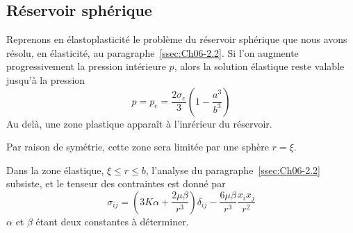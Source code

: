 \subsection{Réservoir sphérique} \label{ssec:Ch10-2.2}
Reprenons en élastoplasticité le problème du réservoir sphérique que nous avons résolu, en élasticité, au paragraphe~\ref{ssec:Ch06-2.2}.
Si l'on augmente progressivement la pression intérieure $p$, alors la solution élastique reste valable jusqu'à la pression 
\begin{equation}
    p = p_e = \frac{2\sigma_e}{3} \left( 1 - \frac{a^3}{b^3} \right)
    \label{eq:Ch10-032}
\end{equation}
Au delà, une zone plastique apparaît à l'inrérieur du réservoir. 
\begin{multicols}{2}
    \begin{center}
    \end{center}
    \columnbreak
    Par raison de symétrie, cette zone sera limitée par une sphère $r=\xi$.
\end{multicols}
Dans la zone élastique, $\xi \leq r \leq b$, l'analyse du paragraphe~\ref{ssec:Ch06-2.2} subsiste, et le tenseur des contraintes est donné par 
\begin{equation}
    \sigma_{ij} = \left( 3 K \alpha + \frac{2\mu \beta}{r^3} \right) \delta_{ij} - \frac{6\mu \beta}{r^3} \frac{x_ix_j}{r^2}
    \label{eq:Ch10-033}
\end{equation}
$\alpha$ et $\beta$ étant deux constantes à déterminer.

\endinput
Dans la zone plastique, a.~'!. <~ , d',,?rès la symétrie sphérique du problème, le tenseur des contraintes aura la forme suivante 

où TIC'!.) représente la partie sphérique du tenseur des contraintes, et 't:('t,) son déviateur. Ce tenseur est de révolution autour de la direction radiale, et les contraintes principales sont 

Les équations d'équilibre appliquées à \eqref{eq:Ch10-034} donnent 
\eqref{eq:Ch10-036} 	.2, "t;'C'I.) 1" G 1:('t,) _ ït'(IL) = 0 It. 
équation différentielle reliant les deux fonctions n('!..) et 'CC'\,) . 
D'autre part, dans la zone plastique on doit aVOlr 
= 



en adoptant par exemple le critère de von Mises (comme on l'a vu en VI.2.2 le critère de Tresca donnerait-le même résultat). On en tire donc 
(37) 

(le Ch01X du signe se fait par continuité avec la solution élastique du § VI.2.2). En reportant dans \eqref{eq:Ch10-036} et en intégrant, on obtient 
(38) 

